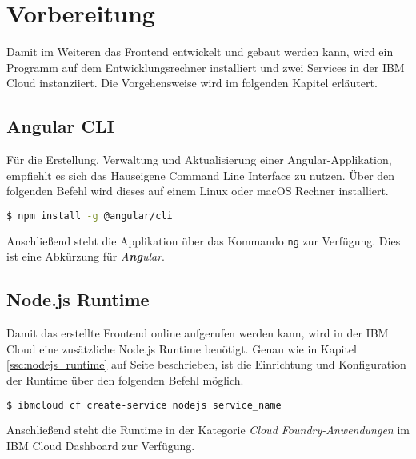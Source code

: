 \section{Vorbereitung}
Damit im Weiteren das Frontend entwickelt und gebaut werden kann, wird ein Programm auf dem Entwicklungsrechner
installiert und zwei Services in der IBM Cloud instanziiert. Die Vorgehensweise wird im folgenden Kapitel erläutert.

\subsection{Angular CLI}
Für die Erstellung, Verwaltung und Aktualisierung einer Angular-Applikation, empfiehlt es sich das Hauseigene Command
Line Interface zu nutzen. Über den folgenden Befehl wird dieses auf einem Linux oder macOS Rechner installiert.

\begin{lstlisting}[language=bash, caption=Installation des Angular CLI, label=Installation des Angular CLI]
$ npm install -g @angular/cli
\end{lstlisting}

Anschließend steht die Applikation über das Kommando \texttt{ng} zur Verfügung. Dies ist eine Abkürzung für
\textit{A\textbf{ng}ular}.

\subsection{Node.js Runtime}
Damit das erstellte Frontend online aufgerufen werden kann, wird in der IBM Cloud eine zusätzliche Node.js Runtime
benötigt. Genau wie in Kapitel \ref{ssc:nodejs_runtime} auf Seite \pageref{ssc:nodejs_runtime} beschrieben, ist die
Einrichtung und Konfiguration der Runtime über den folgenden Befehl möglich.

\begin{lstlisting}[language=bash, caption=Instanziierung der Node.js Runtime, label=Instanziierung der Node.js Runtime]
$ ibmcloud cf create-service nodejs service_name
\end{lstlisting}

Anschließend steht die Runtime in der Kategorie \textit{Cloud Foundry-Anwendungen} im IBM Cloud Dashboard zur Verfügung.